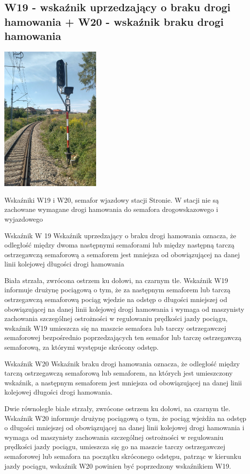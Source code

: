 \subsection{W19 - wskaźnik uprzedzający o braku drogi hamowania + W20 - wskaźnik braku drogi hamowania}
	\begin{marginfigure}
	\includegraphics[width=5cm]{skryptkierownik-img/w19.jpg}
	\caption{Wskaźniki W19 i W20, semafor wjazdowy stacji Stronie. W stacji nie są zachowane wymagane drogi hamowania do semafora drogowskazowego i wyjazdowego}
\end{marginfigure}
Wskaźnik W 19 {\textquotedbl}Wskaźnik uprzedzający o braku drogi hamowania{\textquotedbl} oznacza, że odległość między dwoma następnymi semaforami lub między następną tarczą ostrzegawczą semaforową a semaforem jest mniejsza od obowiązującej na danej linii kolejowej długości drogi hamowania 

Biała strzała, zwrócona ostrzem ku dołowi, na czarnym tle. Wskaźnik W19 informuje drużynę pociągową o tym, że za następnym semaforem lub tarczą ostrzegawczą semaforową pociąg wjedzie na odstęp o długości mniejszej od obowiązującej na danej linii kolejowej drogi hamowania i wymaga od maszynisty zachowania szczególnej ostrożności w regulowaniu
prędkości jazdy pociągu, wskaźnik W19 umieszcza się na maszcie semafora lub tarczy ostrzegawczej semaforowej bezpośrednio poprzedzających ten semafor lub tarczę ostrzegawczą semaforową, za którymi występuje skrócony odstęp. 

Wskaźnik W20 {\textquotedbl}Wskaźnik braku drogi hamowania{\textquotedbl} oznacza, że odległość między tarczą ostrzegawczą semaforową lub semaforem, na których jest umieszczony wskaźnik, a następnym semaforem jest mniejsza od obowiązującej na danej linii kolejowej długości drogi hamowania. 

Dwie równoległe białe strzały, zwrócone ostrzem ku dołowi, na czarnym tle. Wskaźnik W20 informuje drużynę pociągową o
tym, że pociąg wjeżdża na odstęp o długości mniejszej od obowiązującej na danej linii kolejowej drogi hamowania i
wymaga od maszynisty zachowania szczególnej ostrożności w regulowaniu prędkości jazdy pociągu, umieszcza się go na
maszcie tarczy ostrzegawczej semaforowej lub semafora na początku skróconego odstępu, patrząc w kierunku jazdy pociągu,
wskaźnik W20 powinien być poprzedzony wskaźnikiem W19.

